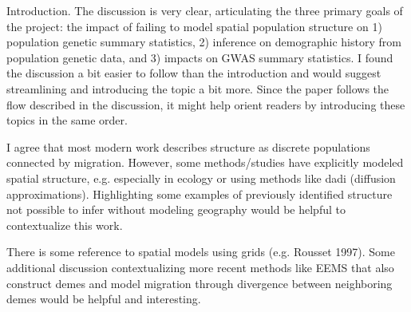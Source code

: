 \begin{point}{}
    Introduction. The discussion is very clear, articulating the three primary goals of the project: the impact of failing to model spatial population structure on 1) population genetic summary statistics, 2) inference on demographic history from population genetic data, and 3) impacts on GWAS summary statistics. I found the discussion a bit easier to follow than the introduction and would suggest streamlining and introducing the topic a bit more. Since the paper follows the flow described in the discussion, it might help orient readers by introducing these topics in the same order.
\end{point}


\begin{point}{}
    I agree that most modern work describes structure as discrete populations connected by migration. However, some methods/studies have explicitly modeled spatial structure, e.g. especially in ecology or using methods like dadi (diffusion approximations). Highlighting some examples of previously identified structure not possible to infer without modeling geography would be helpful to contextualize this work.
\end{point}


\begin{point}{}
    There is some reference to spatial models using grids (e.g. Rousset 1997). Some additional discussion contextualizing more recent methods like EEMS that also construct demes and model migration through divergence between neighboring demes would be helpful and interesting.
\end{point}


